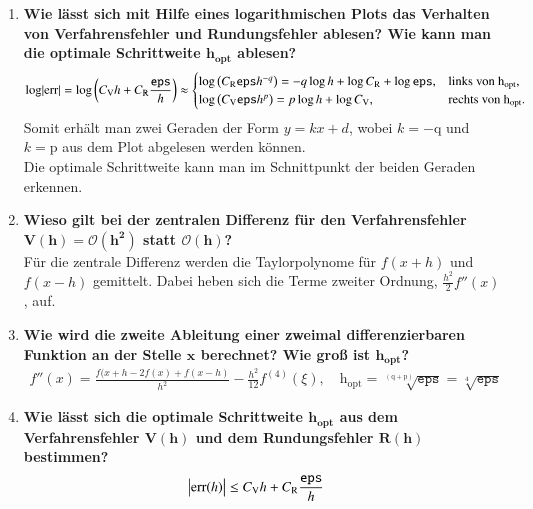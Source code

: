 \begin{enumerate}
\begin{figure}[!htbp]
\begin{minipage}{.5\textwidth}
				\end{minipage}
			\end{figure}			
		\item \textbf{Wie lässt sich mit Hilfe eines logarithmischen Plots das Verhalten von Verfahrensfehler und Rundungsfehler ablesen? Wie kann man die optimale Schrittweite \(\mathbf{h_{opt}}\) ablesen?}
			\begin{align*}
				\log \abs{\text{err}}=\log \left( C_\text{V} h + C_\text{R} \frac{\texttt{eps}}{h}\right) \approx 
					\begin{cases}
						\log\left(C_\text{R}\texttt{eps}h^{-q}\right) =-q\log h + \log C_\text{R}+\log\texttt{eps}  , & \text{links von }  \text{h}_\text{opt},\\
						\log\left(C_\text{V}\texttt{eps}h^p\right) =p\log h + \log C_\text{V} , & \text{rechts von }  \text{h}_\text{opt}.		\\	
					\end{cases}
			\end{align*}
			Somit erhält man zwei Geraden der Form \(y=kx+d\), wobei \(k=-\text{q}\) und \(k=\text{p}\) aus dem Plot abgelesen werden können.\\
			Die optimale Schrittweite kann man im Schnittpunkt der beiden Geraden erkennen. 
		\item \textbf{Wieso gilt bei der zentralen Differenz für den Verfahrensfehler \(\mathbf{V(h)=\mathscr{O}(h^2)}\) statt \(\mathbf{\mathscr{O}(h)}\)?}\\
			Für die zentrale Differenz werden die Taylorpolynome für \(f(x+h)\) und \(f(x-h)\) gemittelt. Dabei heben sich die Terme zweiter Ordnung, \(\frac{h^2}{2}f''(x)\), auf.
		\item \textbf{Wie wird die zweite Ableitung einer zweimal differenzierbaren Funktion an der Stelle \(\mathbf{x}\) berechnet? Wie groß ist \(\mathbf{h_{opt}}\)?}
			\begin{align*}
				f''(x)=\frac{f(x+h-2f(x)+f(x-h)}{h^2}-\frac{h^2}{12}f^{(4)}(\xi), \quad \text{h}_\text{opt}=\sqrt[\left( \text{q}+\text{p}\right) ]{\texttt{eps}}=\sqrt[4]{\texttt{eps}}
			\end{align*}
		\item \textbf{Wie lässt sich die optimale Schrittweite \(\mathbf{h_{opt}}\) aus dem Verfahrensfehler \(\mathbf{V(h)}\) und dem Rundungsfehler \(\mathbf{R(h)}\) bestimmen?}
			\begin{align*}
				\abs{\text{err}(h)}&\leq C_\text{V} h + C_\text{R} \frac{\texttt{eps}}{h}
			\end{align*}

\end{enumerate}
